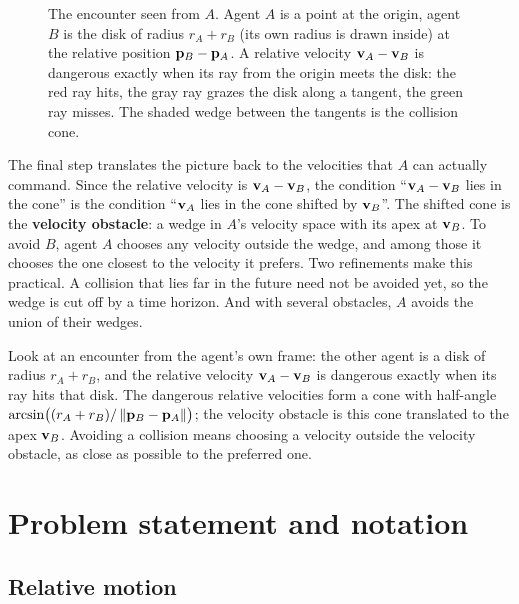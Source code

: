\begin{figure}[tb]
  \centering
  \caption{The encounter seen from $A$. Agent $A$ is a point at the origin,
  agent $B$ is the disk of radius $r_A+r_B$ (its own radius is drawn inside)
  at the relative position $\mathbf{p}_B-\mathbf{p}_A$. A relative velocity
  $\mathbf{v}_A-\mathbf{v}_B$ is dangerous exactly when its ray from the origin meets the
  disk: the red ray hits, the gray ray grazes the disk along a tangent, the
  green ray misses. The shaded wedge between the tangents is the collision
  cone.}
  \label{fig:ch12-idea}
\end{figure}

The final step translates the picture back to the velocities that $A$ can
actually command. Since the relative velocity is $\mathbf{v}_A - \mathbf{v}_B$, the
condition ``$\mathbf{v}_A - \mathbf{v}_B$ lies in the cone'' is the condition ``$\mathbf{v}_A$
lies in the cone shifted by $\mathbf{v}_B$''. The shifted cone is the
\textbf{velocity obstacle}: a wedge in $A$'s velocity
space with its apex at $\mathbf{v}_B$. To avoid $B$, agent $A$ chooses any velocity
outside the wedge, and among those it chooses the one closest to the velocity
it prefers. Two refinements make this practical. A collision that lies far in
the future need not be avoided yet, so the wedge is cut off by a time horizon.
And with several obstacles, $A$ avoids the union of their wedges.

\begin{keyidea}
Look at an encounter from the agent's own frame: the other agent is a disk of
radius $r_A + r_B$, and the relative velocity $\mathbf{v}_A - \mathbf{v}_B$ is dangerous
exactly when its ray hits that disk. The dangerous relative velocities form a
cone with half-angle $\arcsin\bigl((r_A+r_B)/\left\lVert \mathbf{p}_B-\mathbf{p}_A \right\rVert\bigr)$; the
velocity obstacle is this cone translated to the apex $\mathbf{v}_B$. Avoiding a
collision means choosing a velocity outside the velocity obstacle, as close as
possible to the preferred one.
\end{keyidea}

\section{Problem statement and notation}
\label{sec:ch12-problem}

\subsection{Relative motion}

